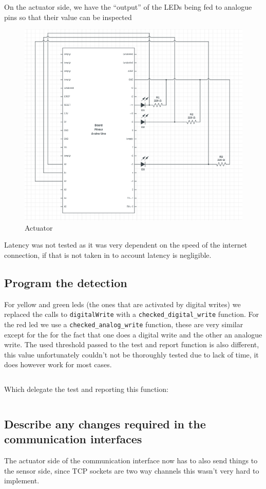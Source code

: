 \documentclass[10pt]{article}
\begin{document}
On the actuator side, we have the ``output'' of the LEDs being fed to analogue
pins so that their value can be inspected

\begin{figure}[H]
    \centering
    \includegraphics[width=\textwidth]{actuator.png}
    \caption{Actuator}
\end{figure}

Latency was not tested as it was very dependent on the speed of the internet
connection, if that is not taken in to account latency is negligible.

\subsection{Program the detection}

For yellow and green leds (the ones that are activated by digital writes) we
replaced the calls to \texttt{digitalWrite} with a
\texttt{checked\_digital\_write} function. For the red led we use a
\texttt{checked\_analog\_write} function, these are very similar except for the
for the fact that one does a digital write and the other an analogue write. The
used threshold passed to the test and report function is also different, this
value unfortunately couldn't not be thoroughly tested due to lack of time, it does
however work for most cases.

\inputminted[firstline=16, lastline=32]{cpp}{../arduino/actuators/actuators.hpp}

Which delegate the test and reporting this function:

\inputminted[firstline=39, lastline=46]{cpp}{../arduino/actuators/actuators.hpp}


\subsection{Describe any changes required in the communication interfaces}

The actuator side of the communication interface now has to also send things to
the sensor side, since TCP sockets are two way channels this wasn't very hard to
implement.
\end{document}
